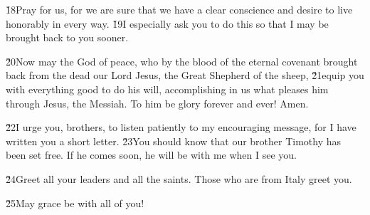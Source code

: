 \v{18}Pray for us, for we are sure that we have a clear conscience and desire to live honorably in every way. \v{19}I especially ask you to do this so that I may be brought back to you sooner.

\v{20}Now may the God of peace, who by the blood of the eternal covenant brought back from the dead our Lord Jesus, the Great Shepherd of the sheep, \v{21}equip you with everything good to do his will, accomplishing in us what pleases him through Jesus, the Messiah. To him be glory forever and ever! Amen.

\v{22}I urge you, brothers, to listen patiently to my encouraging message, for I have written you a short letter. \v{23}You should know that our brother Timothy has been set free. If he comes soon, he will be with me when I see you.

\v{24}Greet all your leaders and all the saints. Those who are from Italy greet you.

\v{25}May grace be with all of you!
